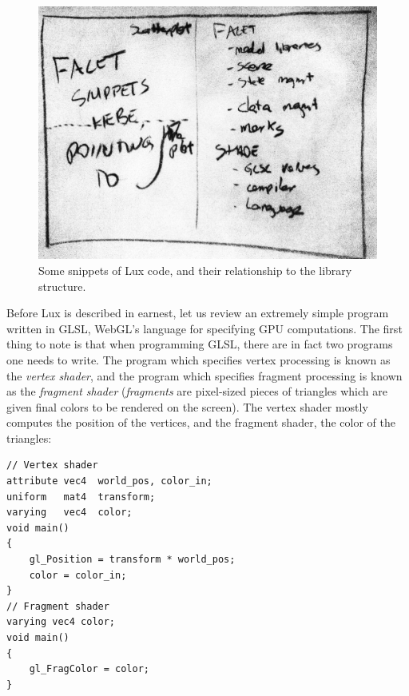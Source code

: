 \begin{figure}
\includegraphics[width=\linewidth]{fig/snippet_overview/overview.jpg}
\caption{Some snippets of Lux code, and their relationship to the
library structure.\label{fig:facetsnippet}}
\end{figure}

Before Lux is described in earnest, let us review an extremely simple program written in GLSL, WebGL's language for specifying GPU computations. 
The first thing to note is that when programming GLSL, there are in fact two programs one needs to write. 
The program which specifies vertex processing is known as the \emph{vertex shader}, and the program which specifies fragment processing is known as the \emph{fragment shader} (\emph{fragments} are pixel-sized pieces of triangles which are given final colors to be rendered on the screen). 
The vertex shader mostly computes the position of the vertices, and the fragment shader, the color of the triangles:

\begin{verbatim}
// Vertex shader
attribute vec4  world_pos, color_in;
uniform   mat4  transform;
varying   vec4  color;
void main()
{
    gl_Position = transform * world_pos;
    color = color_in;
}
// Fragment shader
varying vec4 color;
void main()
{
    gl_FragColor = color;
}
\end{verbatim}

